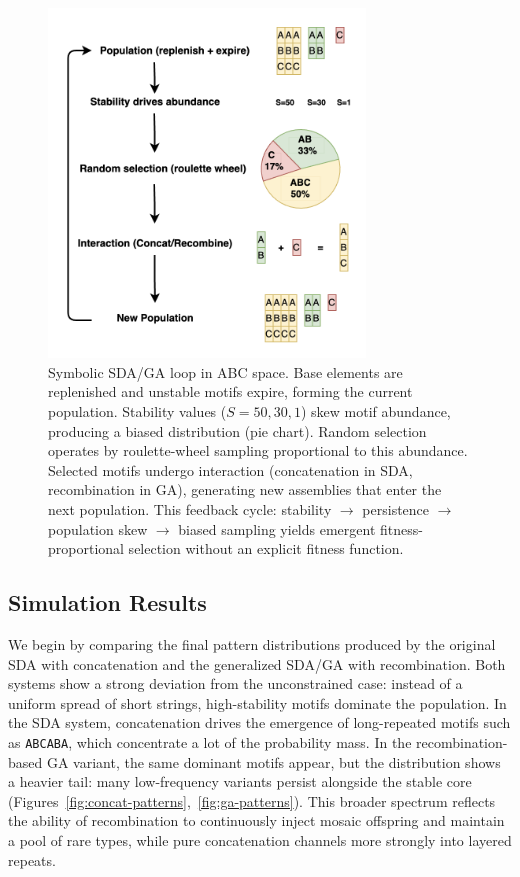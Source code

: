 \documentclass[life,article,submit,pdftex,moreauthors]{Definitions/mdpi}
\begin{document}
\begin{figure}[H]
    \centering
    \includegraphics[width=0.75\textwidth]{SDA-Sym.png}
    \caption{Symbolic SDA/GA loop in ABC space. 
    Base elements are replenished and unstable motifs expire, forming the current population. 
    Stability values ($S=50,30,1$) skew motif abundance, producing a biased distribution (pie chart). 
    Random selection operates by roulette-wheel sampling proportional to this abundance. 
    Selected motifs undergo interaction (concatenation in SDA, recombination in GA), 
    generating new assemblies that enter the next population. 
    This feedback cycle: stability $\to$ persistence $\to$ population skew $\to$ biased sampling yields emergent fitness-proportional selection without an explicit fitness function.}
    \label{fig:sda-loop}
\end{figure}


\subsection{Simulation Results}

We begin by comparing the final pattern distributions produced by the original SDA with concatenation and the generalized SDA/GA with recombination. Both systems show a strong deviation from the unconstrained case: instead of a uniform spread of short strings, high-stability motifs dominate the population. In the SDA system, concatenation drives the emergence of long-repeated motifs such as \texttt{ABCABA}, which concentrate a lot of the probability mass. In the recombination-based GA variant, the same dominant motifs appear, but the distribution shows a heavier tail: many low-frequency variants persist alongside the stable core (Figures~\ref{fig:concat-patterns},~\ref{fig:ga-patterns}). This broader spectrum reflects the ability of recombination to continuously inject mosaic offspring and maintain a pool of rare types, while pure concatenation channels more strongly into layered repeats.
\end{document}
